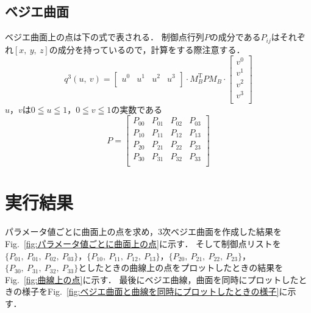 \documentclass[a4paper,10pt]{jsarticle}
\begin{document}
\subsection{ベジエ曲面}
ベジエ曲面上の点は下の式で表される．
制御点行列$P$の成分である$P_{ij}$はそれぞれ$[x,\ y,\ z]$の成分を持っているので，計算をする際注意する．
\begin{equation}
\label{eq:c}
  q^3(u,\ v) = \left[
    \begin{array}{cccc}
      u^0 & u^1 & u^2 & u^3 \\
    \end{array}
  \right]\cdot M_B^{\mathrm{T}}P M_B \cdot
  \left[
    \begin{array}{c}
      v^0\\
      v^1\\
      v^2\\
      v^3\\
    \end{array}
  \right]
\end{equation}
$u$，$v$は$0\leqq u \leqq 1$，$0\leqq v \leqq 1$の実数である
\begin{equation}
\label{eq:d}
  P =
  \left[
    \begin{array}{cccc}
     P_{00} & P_{01} & P_{02} & P_{03} \\
     P_{10} & P_{11} & P_{12} & P_{13}\\
     P_{20} & P_{21} & P_{22} & P_{23}\\
     P_{30} & P_{31} & P_{32} & P_{33}\\
    \end{array}
  \right]
\end{equation}

\section{実行結果}
パラメータ値ごとに曲面上の点を求め，3次ベジエ曲面を作成した結果をFig.~\ref{fig:パラメータ値ごとに曲面上の点}に示す．
そして制御点リストを$\{P_{01},\ P_{01},\ P_{02},\ P_{03}\}$，$\{P_{10},\ P_{11},\ P_{12},\ P_{13}\}$，$\{P_{20},\ P_{21},\ P_{22},\ P_{23}\}$，$\{P_{30},\ P_{31},\ P_{32},\ P_{33}\}$としたときの曲線上の点をプロットしたときの結果をFig.~\ref{fig:曲線上の点}に示す．
最後にベジエ曲線，曲面を同時にプロットしたときの様子をFig.~\ref{fig:ベジエ曲面と曲線を同時にプロットしたときの様子}に示す．
\end{document}
